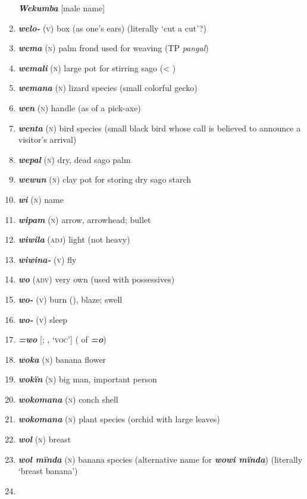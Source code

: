 \begin{enumerate}[noitemsep, label={}, align=left, widest=190, labelsep=1ex,leftmargin=*,itemindent=-10pt]
\textbf{\textit{Wekumba}} [male name] \item 
\textbf{\textit{welo-}} (\textsc{v}) box (as one’s ears) (literally ‘cut a cut’?) \item 
\textbf{\textit{wema}} (\textsc{n}) palm frond used for weaving (TP \textit{pangal}) \item 
\textbf{\textit{wemali}} (\textsc{n}) large pot for stirring sago (< ) \item 
\textbf{\textit{wemana}} (\textsc{n}) lizard species (small colorful gecko) \item 
\textbf{\textit{wen}} (\textsc{n}) handle (as of a pick-axe) \item 
\textbf{\textit{wenta}} (\textsc{n}) bird species (small black bird whose call is believed to announce a visitor’s arrival) \item 
\textbf{\textit{wepal}} (\textsc{n}) dry, dead sago palm \item 
\textbf{\textit{wewun}} (\textsc{n}) clay pot for storing dry sago starch \item 
\textbf{\textit{wi}} (\textsc{n}) name \item 
\textbf{\textit{wipam}} (\textsc{n}) arrow, arrowhead; bullet \item 
\textbf{\textit{wiwila}} (\textsc{adj}) light (not heavy) \item 
\textbf{\textit{wiwina-}} (\textsc{v}) fly \item 
\textbf{\textit{wo}} (\textsc{adv}) very own (used with possessives) \item 
\textbf{\textit{wo-}} (\textsc{v}) burn (), blaze; swell \item 
\textbf{\textit{wo-}} (\textsc{v}) sleep \item 
\textbf{\textit{=wo}} [;  , ‘\textsc{voc}’] ( of \textbf{\textit{=o}}) \item 
\textbf{\textit{woka}} (\textsc{n}) banana flower \item 
\textbf{\textit{wokïn}} (\textsc{n}) big man, important person \item 
\textbf{\textit{wokomana}} (\textsc{n}) conch shell \item 
\textbf{\textit{wokomana}} (\textsc{n}) plant species (orchid with large leaves) \item 
\textbf{\textit{wol}} (\textsc{n}) breast \item 
\textbf{\textit{wol mïnda}} (\textsc{n}) banana species (alternative name for \textbf{\textit{wowi mïnda}}) (literally ‘breast banana’) \item 

\end{enumerate}
